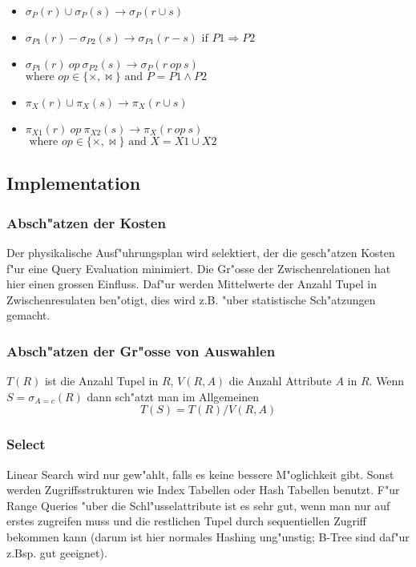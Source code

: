 \documentclass[german, 10pt, a4paper, twocolumn]{scrartcl}
\theoremstyle{definition}
\theoremstyle{remark}
\theoremstyle{example}
\begin{document}
\begin{itemize}
	\item $\sigma_P(r) \cup \sigma_P(s) \rightarrow \sigma_P(r \cup s)$
	\item $\sigma_{P1}(r) - \sigma_{P2}(s) \rightarrow \sigma_{P1}(r - s) \mbox{ if }P1 \Rightarrow P2$
	\item $\sigma_{P1}(r) \ op \ \sigma_{P2}(s) \rightarrow \sigma_P (r \ op \ s)$\\
		$\mbox{where } op \in \{ \times, \bowtie \} \mbox{ and } P= P1 \land P2$
	\item $\pi_X(r) \cup \pi_X (s) \rightarrow \pi_X (r \cup s)$
	\item $\pi_{X1}(r) \ op \ \pi_{X2}(s) \rightarrow \pi_X (r \ op \ s)$\\
		$\mbox{ where } op \in \{ \times, \bowtie \} \mbox{ and } X = X1 \cup X2$
\end{itemize}

\subsection{Implementation}

\subsubsection{Absch"atzen der Kosten}

Der physikalische Ausf"uhrungsplan wird selektiert, der die gesch"atzen Kosten f"ur eine Query Evaluation minimiert. Die Gr"osse der Zwischenrelationen hat hier einen grossen Einfluss. Daf"ur werden Mittelwerte der Anzahl Tupel in Zwischenresulaten ben"otigt, dies wird z.B. "uber statistische Sch"atzungen gemacht.

\subsubsection{Absch"atzen der Gr"osse von Auswahlen}

$T(R)$ ist die Anzahl Tupel in $R$, $V(R,A)$ die Anzahl Attribute $A$ in $R$. Wenn $S=\sigma_{A=c}(R)$ dann sch"atzt man im Allgemeinen
\begin{displaymath}
	T(S) = T(R) / V(R,A)
\end{displaymath}

\subsubsection{Select}

Linear Search wird nur gew"ahlt, falls es keine bessere M"oglichkeit gibt. Sonst werden Zugriffsstrukturen wie Index Tabellen oder Hash Tabellen benutzt. F"ur Range Queries "uber die Schl"usselattribute ist es sehr gut, wenn man nur auf erstes zugreifen muss und die restlichen Tupel durch sequentiellen Zugriff bekommen kann (darum ist hier normales Hashing ung"unstig; B-Tree sind daf"ur z.Bsp. gut geeignet).
\end{document}
